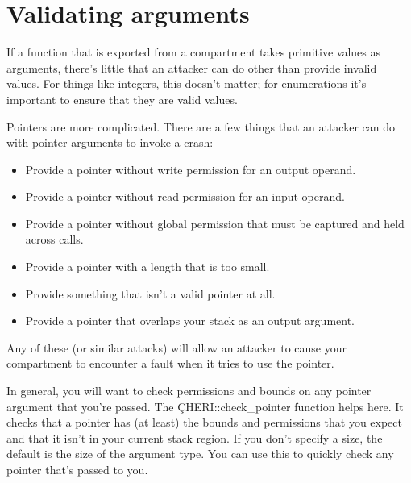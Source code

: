\section{Validating arguments}

If a function that is exported from a compartment takes primitive values as arguments, there's little that an attacker can do other than provide invalid values.
For things like integers, this doesn't matter; for enumerations it's important to ensure that they are valid values.

Pointers are more complicated.
There are a few things that an attacker can do with pointer arguments to invoke a crash:

\begin{itemize}
	\item{Provide a pointer without write permission for an output operand.}
	\item{Provide a pointer without read permission for an input operand.}
	\item{Provide a pointer without global permission that must be captured and held across calls.}
	\item{Provide a pointer with a length that is too small.}
	\item{Provide something that isn't a valid pointer at all.}
	\item{Provide a pointer that overlaps your stack as an output argument.}
\end{itemize}

Any of these (or similar attacks) will allow an attacker to cause your compartment to encounter a fault when it tries to use the pointer.

In general, you will want to check permissions and bounds on any pointer argument that you're passed.
The \c{CHERI::check_pointer} function helps here.
It checks that a pointer has (at least) the bounds and permissions that you expect and that it isn't in your current stack region.
If you don't specify a size, the default is the size of the argument type.
You can use this to quickly check any pointer that's passed to you.


